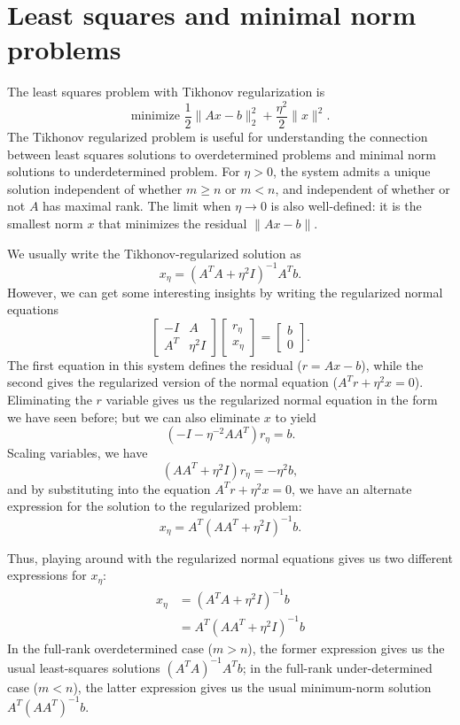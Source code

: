 \documentclass[12pt, leqno]{article} %
\begin{document}


\section{Least squares and minimal norm problems}


The least squares problem with Tikhonov regularization is
\[
  \mbox{minimize } \frac{1}{2} \|Ax-b\|_2^2 + \frac{\eta^2}{2} \|x\|^2.
\]
The Tikhonov regularized problem is useful for understanding the
connection between least squares solutions to overdetermined problems
and minimal norm solutions to underdetermined problem.
For $\eta > 0$, the system admits a unique solution independent of whether $m
\geq n$ or $m < n$, and independent of whether or not $A$ has maximal
rank.  The limit when $\eta \rightarrow 0$ is also well-defined:
it is the smallest norm $x$ that minimizes the residual $\|Ax-b\|$.

We usually write the Tikhonov-regularized solution as
\[
  x_\eta = (A^T A + \eta^2 I)^{-1} A^T b.
\]
However, we can get some interesting insights by writing the
regularized normal equations
\[
  \begin{bmatrix} -I & A \\ A^T & \eta^2 I \end{bmatrix}
  \begin{bmatrix} r_\eta \\ x_\eta \end{bmatrix} =
  \begin{bmatrix} b \\ 0 \end{bmatrix}.
\]
The first equation in this system defines the residual ($r = Ax-b$),
while the second gives the regularized version of the normal equation
($A^T r + \eta^2 x = 0$).  Eliminating the $r$ variable gives us the
regularized normal equation in the form we have seen before; but we
can also eliminate $x$ to yield
\[
  (-I - \eta^{-2} A A^T) r_\eta = b.
\]
Scaling variables, we have
\[
  (AA^T + \eta^2 I) r_\eta = -\eta^2 b,
\]
and by substituting into the equation $A^T r + \eta^2 x = 0$, we have
an alternate expression for the solution to the regularized problem:
\[
  x_\eta = A^T (AA^T + \eta^2 I)^{-1} b.
\]

Thus, playing around with the regularized normal equations gives us
two different expressions for $x_\eta$:
\begin{align*}
  x_\eta &= (A^T A + \eta^2 I)^{-1} b \\
        &= A^T (AA^T + \eta^2 I)^{-1} b
\end{align*}
In the full-rank overdetermined case ($m > n$), the former expression
gives us the usual least-squares solutions $(A^T A)^{-1} A^T b$;
in the full-rank under-determined case ($m < n$), the latter
expression gives us the usual minimum-norm solution $A^T (AA^T)^{-1} b$.
\end{document}
